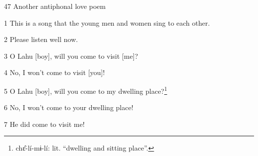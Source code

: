
47 Another antiphonal love poem

1 This is a song that the young men and women sing to each other.

2 Please listen well now.

3 O Lahu [boy], will you come to visit [me]?

4 No, I won't come to visit [you]!

5 O Lahu [boy], will you come to my dwelling place?\footnote{chɛ̂-lí-mɨ-lí: lit. ``dwelling and sitting place''.}

6 No, I won't come to your dwelling place!

7 He did come to visit me!

